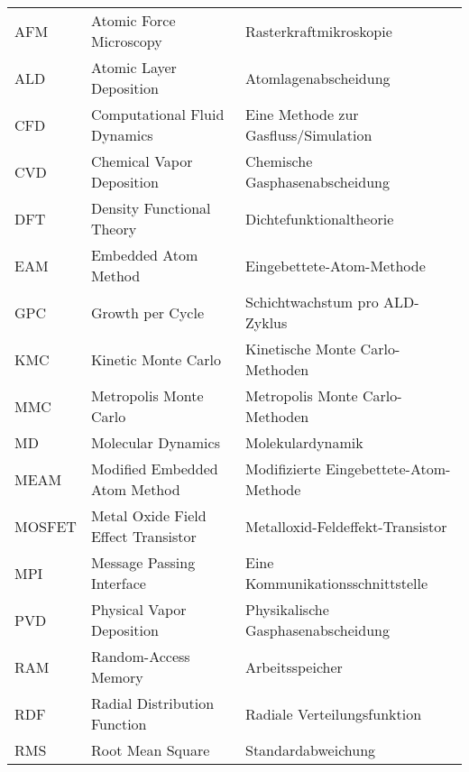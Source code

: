 \def\arraystretch{1.3}
\begin{tabular}{lll}
AFM       & Atomic Force Microscopy             & Rasterkraftmikroskopie                                     \\
ALD       & Atomic Layer Deposition             & Atomlagenabscheidung                                       \\
CFD       & Computational Fluid Dynamics        & Eine Methode zur Gasfluss/Simulation                       \\
CVD       & Chemical Vapor Deposition           & Chemische Gasphasenabscheidung                             \\
DFT       & Density Functional Theory           & Dichtefunktionaltheorie                                    \\
EAM       & Embedded Atom Method                & Eingebettete-Atom-Methode                                  \\
GPC       & Growth per Cycle                    & Schichtwachstum pro ALD-Zyklus                             \\
KMC       & Kinetic Monte Carlo                 & Kinetische Monte Carlo-Methoden                            \\
MMC       & Metropolis Monte Carlo              & Metropolis Monte Carlo-Methoden                            \\
MD        & Molecular Dynamics                  & Molekulardynamik                                           \\
MEAM      & Modified Embedded Atom Method       & Modifizierte Eingebettete-Atom-Methode                     \\
MOSFET    & Metal Oxide Field Effect Transistor & Metalloxid-Feldeffekt-Transistor                           \\
MPI       & Message Passing Interface           & Eine Kommunikationsschnittstelle                           \\
PVD       & Physical Vapor Deposition           & Physikalische Gasphasenabscheidung                         \\
RAM       & Random-Access Memory                & Arbeitsspeicher                                            \\
RDF       & Radial Distribution Function        & Radiale Verteilungsfunktion                                \\
RMS       & Root Mean Square                    & Standardabweichung                                         \\

\end{tabular}
